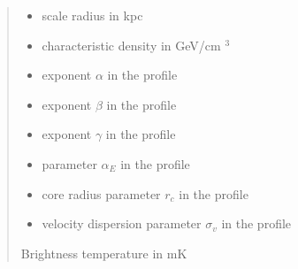 \documentclass[letterpaper,10pt,english]{sphinxmanual}
\begin{document}
\begin{fulllineitems}
\begin{itemize}
\end{itemize}
\begin{quote}\begin{description}
\begin{itemize}
\item {} 
\sphinxAtStartPar
{} \textendash{} scale radius in kpc

\item {} 
\sphinxAtStartPar
{} \textendash{} characteristic density in GeV/cm \({}^3\)

\item {} 
\sphinxAtStartPar
{} \textendash{} exponent \(\alpha\) in the {\hyperref[\detokenize{diffsph.profiles:diffsph.profiles.templates.hdz}]{}} profile

\item {} 
\sphinxAtStartPar
{} \textendash{} exponent \(\beta\) in the {\hyperref[\detokenize{diffsph.profiles:diffsph.profiles.templates.hdz}]{}} profile

\item {} 
\sphinxAtStartPar
{} \textendash{} exponent \(\gamma\) in the {\hyperref[\detokenize{diffsph.profiles:diffsph.profiles.templates.hdz}]{}} profile

\item {} 
\sphinxAtStartPar
{} \textendash{} parameter \(\alpha_E\) in the {\hyperref[\detokenize{diffsph.profiles:diffsph.profiles.templates.enst}]{}} profile

\item {} 
\sphinxAtStartPar
{} \textendash{} core radius parameter \(r_c\) in the {\hyperref[\detokenize{diffsph.profiles:diffsph.profiles.templates.cnfw}]{}} profile

\item {} 
\sphinxAtStartPar
{} \textendash{} velocity dispersion parameter \(\sigma_v\) in the {\hyperref[\detokenize{diffsph.profiles:diffsph.profiles.templates.sis}]{}} profile

\end{itemize}

\sphinxAtStartPar
Brightness temperature in mK

\end{description}\end{quote}

\end{fulllineitems}
\end{document}
